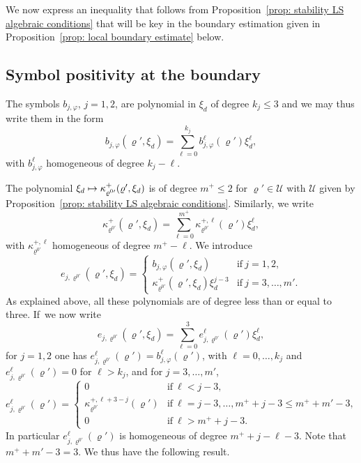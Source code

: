 \documentclass[JEP,XML,SOM,Unicode,published]{cedram}
\newcommand\mto{\mathchoice{\longmapsto}{\mapsto}{\mapsto}{\mapsto}}
\theoremstyle{plain}
\theoremstyle{definition}
\let\k\kappa
\let\y\varrho
\newcommand{\U}{\mathscr U}
\begin{document}
We now express an inequality that follows from Proposition~\ref{prop:
stability LS algebraic conditions} that will be key in the boundary
estimation given in Proposition~\ref{prop: local boundary
estimate} below.

\subsection{Symbol positivity at the boundary}
\label{sec: Symbol postivity at the boundary}
The symbols $b_{j,\varphi}$, $j=1,2$, are polynomial in $\xi_d$ of
degree $k_j \leq 3$ and we
may thus write them in the form
\begin{equation*}
b_{j,\varphi}(\y',\xi_d)=\sum_{\ell=0}^{k_j}b_{j,\varphi}^\ell (\y')\xi_d^\ell,
\end{equation*}
with $b_{j,\varphi}^\ell$ homogeneous of degree $k_j-\ell$.

The polynomial $\xi_d \mto \k^+_{\y^{0\prime}} (\y',\xi_d)$ is of
degree $m^+ \leq 2$ for $\y'\in \U$ with $\U$ given by Proposition~\ref{prop: stability LS algebraic conditions}.
Similarly, we write
\begin{equation*}
\k^+_{\y^{0\prime}} (\y',\xi_d)=\sum_{\ell=0}^{m^+}\k^{+,\ell}_{\y^{0\prime}} (\y')\xi_d^\ell,
\end{equation*}
with $\k^{+,\ell}_{\y^{0\prime}}$ homogeneous of degree $m^+-\ell$.
We introduce
\begin{equation*}
e_{j, \y^{0\prime}} (\y', \xi_d) =
\begin{cases}
b_{j,\varphi}(\y',\xi_d) & \text{if} \ j=1,2,\\
\k^+_{\y^{0\prime}} (\y',\xi_d) \xi_d^{j-3} & \text{if} \ j=3,\dots, m'.
\end{cases}
\end{equation*}
As explained above, all these polynomials are of degree less than or
equal to three.
If~we now write
\begin{equation*}
e_{j, \y^{0\prime}} (\y', \xi_d)
= \sum_{\ell=0}^{3} e_{j,
\y^{0\prime}}^\ell (\y') \xi_d^\ell,
\end{equation*}
for $j=1,2$ one has $e_{j, \y^{0\prime}}^\ell (\y') =
b_{j,\varphi}^\ell (\y')$, with $\ell =0, \dots, k_j$ and $e_{j,
\y^{0\prime}}^\ell (\y') =0$ for $\ell > k_j$, and for
$j=3,\dots,m'$,
\begin{equation*}
e_{j, \y^{0\prime}}^\ell (\y') =
\begin{cases}
0 & \text{if} \ \ell < j-3,\\
\k^{+,\ell+3-j}_{\y^{0\prime}} (\y') & \text{if} \ \ell=j-3,\dots,
m^+ + j- 3\leq m^+ + m' -3,\\
0 & \text{if} \ \ell > m^+ + j- 3.
\end{cases}
\end{equation*}
In particular $e_{j, \y^{0\prime}}^\ell\! (\y')$ is homogeneous of
degree $m^+ \!+j - \ell -3$. Note that~\hbox{$m^+ \!+\! m' \!-\!3\!=\!3$}.
We thus have the following result.
\end{document}
